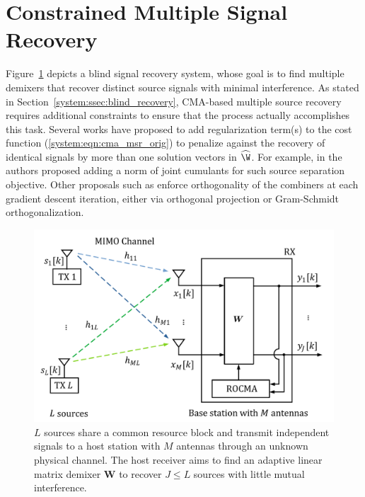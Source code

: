 

\section{Constrained Multiple Signal Recovery}
Figure~\ref{rocma:fig:system_model} depicts a blind signal recovery system, whose goal is to find multiple demixers that recover distinct source signals with minimal interference.
As stated in Section~\ref{system:ssec:blind_recovery}, CMA-based multiple source recovery requires additional constraints to ensure that the process actually accomplishes this task. Several works have proposed to add regularization term(s) to the cost function (\ref{system:eqn:cma_msr_orig}) to penalize against the recovery of identical signals by more than one solution vectors in $\widehat\W$.
For example, in \cite{Bessios1992mimocrimno,Li1998adaptivemimocma} the authors proposed adding a norm of joint cumulants for such source separation objective. 
Other proposals such as \cite{Nguyen1997} enforce orthogonality of the combiners at each gradient descent iteration, either via orthogonal projection or Gram-Schmidt orthogonalization. 
\begin{figure}[tbp]
	\centering
	\includegraphics[width=0.6\linewidth]{./figs/rocma_figs/RMSR_system_model_4.pdf}
	\caption{$L$ sources share a common resource block and transmit independent signals to a host station with $M$ antennas through an unknown physical channel. The host receiver aims to find an adaptive linear matrix demixer $\bm{W}$ to recover $J\leq L$ sources with little mutual interference.}\label{rocma:fig:system_model}
\end{figure}

